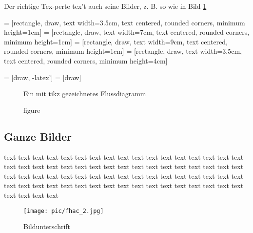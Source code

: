Der richtige Tex-perte tex't auch seine Bilder, z. B. so wie in Bild \ref{bild2}

	 = [rectangle, draw, 
    text width=3.5cm, text centered, rounded corners, minimum height=1cm]
	 = [rectangle, draw, 
    text width=7cm, text centered, rounded corners, minimum height=1cm]
	 = [rectangle, draw, 
    text width=9cm, text centered, rounded corners, minimum height=1cm]
	 = [rectangle, draw, 
    text width=3.5cm, text centered, rounded corners, minimum height=4cm]
	 
	 = [draw, -latex']
	 = [draw]

\begin{figure}[H]
\begin{center}
\caption{figure}{Ein mit tikz gezeichnetes Flussdiagramm}
\label{bild2}
\end{center}
\end{figure}


\subsection{Ganze Bilder}
text text text text text text text text text text text text text text text text text text text text text text text text text text text text text text text text text text text text text text text text text text text text text text text text text text text text text text text text text text text text text text text text text text text text text text text text

\begin{figure}[H]
	\centering
		\texttt{[image: pic/fhac\_2.jpg]}
	\caption{Bildunterschrift}
	\label{fig:fhaachen}
\end{figure}
\vspace{1cm} %

